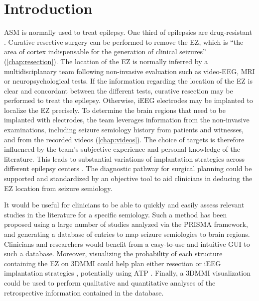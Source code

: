 \section{Introduction}

\Ac{ASM} is normally used to treat epilepsy.
One third of epilepsies are drug-resistant \cite{engel_what_2016}.
Curative resective surgery can be performed to remove the \ac{EZ}, which is ``the area of cortex indispensable for the generation of clinical seizures'' \cite{rosenow_presurgical_2001} (\cref{chap:resection}).
The location of the \ac{EZ} is normally inferred by a multidisciplanary team following non-invasive evaluation such as video-\ac{EEG}, \ac{MRI} or neuropsychological tests.
If the information regarding the location of the \ac{EZ} is clear and concordant between the different tests, curative resection may be performed to treat the epilepsy.
Otherwise, \ac{iEEG} electrodes may be implanted to localize the \ac{EZ} precisely.
To determine the brain regions that need to be implanted with electrodes, the team leverages information from the non-invasive examinations, including seizure semiology history from patients and witnesses, and from the recorded videos (\cref{chap:videos}).  %
The choice of targets is therefore influenced by the team's subjective experience and personal knowledge of the literature.
This leads to substantial variations of implantation strategies across different epilepsy centers \cite{tufenkjian_seizure_2012}.
The diagnostic pathway for surgical planning could be supported and standardized by an objective tool to aid clinicians in deducing the \ac{EZ} location from seizure semiology.

It would be useful for clinicians to be able to quickly and easily assess relevant studies in the literature for a specific semiology.
Such a method has been proposed \cite{alim-marvasti_probabilistic_2021} using a large number of studies analyzed via the \ac{PRISMA} framework, and generating a database of entries to map seizure semiologies to brain regions.
Clinicians and researchers would benefit from a easy-to-use and intuitive \ac{GUI} to such a database.
Moreover, visualizing the probability of each structure containing the \ac{EZ} on \ac{3DMMI} could help plan either resection or \ac{iEEG} implantation strategies \cite{nowell_resection_2017, nowell_utility_2015}, potentially using \ac{ATP} \cite{sparks_automated_2017}.
Finally, a \ac{3DMMI} visualization could be used to perform qualitative and quantitative analyses of the retrospective information contained in the database.

